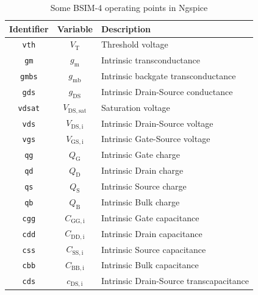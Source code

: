 \documentclass{article}[11pt]
\begin{document}
\begin{table}[H]
\centering
\caption{Some BSIM-4 operating points in Ngspice}
\begin{tabular}{ccl}
\toprule
\textbf{Identifier}  & \textbf{Variable}      & \textbf{Description}                                   \\ \midrule
\texttt{vth}         & $V_{\mathrm{T}}$       & Threshold voltage                                      \\ 
\texttt{gm}          & $g_{\mathrm{m}}$       & Intrinsic transconductance                             \\ 
\texttt{gmbs}        & $g_{\mathrm{mb}}$      & Intrinsic backgate transconductance                    \\ 
\texttt{gds}         & $g_{\mathrm{DS}}$      & Intrinsic Drain-Source conductance                     \\ 
\texttt{vdsat}       & $V_{\mathrm{DS,sat}}$  & Saturation voltage                                     \\ 
\texttt{vds}         & $V_{\mathrm{DS,i}}$    & Intrinsic Drain-Source voltage                         \\ 
\texttt{vgs}         & $V_{\mathrm{GS,i}}$    & Intrinsic Gate-Source voltage                          \\ 
\texttt{qg}          & $Q_{\mathrm{G}}$       & Intrinsic Gate charge                                  \\ 
\texttt{qd}          & $Q_{\mathrm{D}}$       & Intrinsic Drain charge                                 \\ 
\texttt{qs}          & $Q_{\mathrm{S}}$       & Intrinsic Source charge                                \\ 
\texttt{qb}          & $Q_{\mathrm{B}}$       & Intrinsic Bulk charge                                  \\ 
\texttt{cgg}         & $C_{\mathrm{GG,i}}$    & Intrinsic Gate capacitance                             \\ 
\texttt{cdd}         & $C_{\mathrm{DD,i}}$    & Intrinsic Drain capacitance                            \\ 
\texttt{css}         & $C_{\mathrm{SS,i}}$    & Intrinsic Source capacitance                           \\ 
\texttt{cbb}         & $C_{\mathrm{BB,i}}$    & Intrinsic Bulk capacitance                             \\ 
\texttt{cds}         & $c_{\mathrm{DS,i}}$    & Intrinsic Drain-Source transcapacitance                \\ 

\end{tabular}
\end{table}
\end{document}
